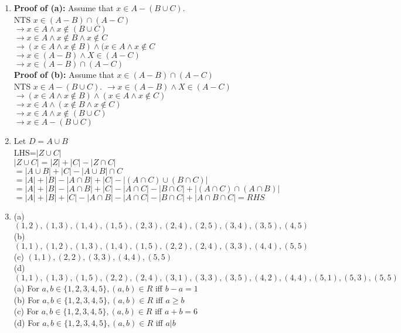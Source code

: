 \documentclass[12pt]{article}
\begin{document}
\begin{enumerate}
\item
\noindent \textbf{Proof of (a):} Assume that $x \in A - (B \cup C).$\\
NTS $x \in (A - B) \cap (A - C)$\\
$\to x \in A \wedge x \notin (B \cup C)$\\
$\to x \in A \wedge x \notin B \wedge x\notin C$\\
$\to (x \in A \wedge x \notin B) \wedge (x \in A \wedge x \notin C$\\
$\to x \in (A-B) \wedge X \in (A-C)$\\
$\to x \in (A - B) \cap (A - C)$\\
\vspace{0.15in}
\noindent \textbf{Proof of (b):} Assume that $x \in (A - B) \cap (A - C)$\\
NTS $x \in A - (B \cup C).$
$\to x \in (A-B) \wedge X \in (A-C)$\\
$\to (x \in A \wedge x \notin B) \wedge (x \in A \wedge x \notin C)$\\
$\to x \in A \wedge (x \notin B \wedge x\notin C)$\\
$\to x \in A \wedge x \notin (B \cup C)$\\
$\to x \in A - (B \cup C)$\\

\item
Let $D=A \cup B$\\
LHS=$|Z \cup C|$\\
$|Z \cup C|=|Z|+|C|-|Z \cap C|$\\
$=|A \cup B|+|C|-|A\cup B|\cap C$\\
$=|A|+|B|-|A\cap B|+|C|-|(A\cap C)\cup(B \cap C)|$\\
$=|A|+|B|-|A\cap B|+|C|-|A\cap C|-|B\cap C|+|(A\cap C)\cap(A\cap B)|$\\
$=|A|+|B|+|C|-|A\cap B|-|A\cap C|-|B\cap C|+|A\cap B\cap C|=RHS$\\

\item
{}(a) $(1,2),(1,3),(1,4),(1,5),(2,3),(2,4),(2,5),(3,4),(3,5),(4,5)$\\
(b) $(1,1),(1,2),(1,3),(1,4),(1,5),(2,2),(2,4),(3,3),(4,4),(5,5)$\\
(c) $(1,1),(2,2),(3,3),(4,4),(5,5)$\\
(d) $(1,1),(1,3),(1,5),(2,2),(2,4),(3,1),(3,3),(3,5),(4,2),(4,4),(5,1),(5,3),(5,5)$\\
(a) For $a,b \in \{1,2,3,4,5\}, (a,b) \in R$ iff $b-a=1$\\
(b) For $a,b \in \{1,2,3,4,5\}, (a,b) \in R$ iff $a \geq b$\\
(c) For $a,b \in \{1,2,3,4,5\}, (a,b) \in R$ iff $a+b=6$\\
(d) For $a,b \in \{1,2,3,4,5\}, (a,b) \in R$ iff $a|b$\\


\end{enumerate}
\end{document}
